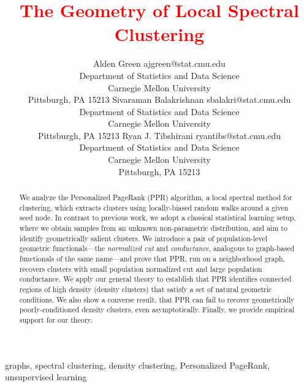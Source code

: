 \documentclass[11pt,twoside]{article}
\newcommand{\1}{\mathbf{1}}
\begin{document}
	
\title{\textcolor{red}{The Geometry of Local Spectral Clustering}}

\author{\name Alden Green \email ajgreen@stat.cmu.edu \\
	\addr Department of Statistics and Data Science\\
	Carnegie Mellon University\\
	Pittsburgh, PA 15213
	\AND
	\name Sivaraman Balakrishnan \email sbalakri@stat.cmu.edu \\
	\addr Department of Statistics and Data Science\\
	Carnegie Mellon University\\
	Pittsburgh, PA 15213
	\AND
	Ryan J. Tibshirani \email ryantibs@stat.cmu.edu \\
	\addr Department of Statistics and Data Science\\
	Carnegie Mellon University\\
	Pittsburgh, PA 15213}

\maketitle

\begin{abstract}
	We analyze the Personalized PageRank (PPR) algorithm, a local spectral method
	for clustering, which extracts clusters using locally-biased random walks around
	a given seed node.  In contrast to previous work, we adopt a classical
	statistical learning setup, where we obtain samples from an unknown non-parametric distribution, and aim to identify geometrically salient clusters.  We introduce a pair of population-level geometric functionals---the \emph{normalized cut} and \emph{conductance}, analogous to graph-based functionals of the same name---and prove that PPR, run on a neighborhood graph, recovers clusters with small population normalized cut and large population conductance. We apply our general theory to establish that PPR identifies connected regions of high density (density clusters) that satisfy a set of natural geometric conditions. We also show a converse result, that PPR can fail to recover
	geometrically poorly-conditioned density clusters, even asymptotically. Finally,
	we provide empirical support for our theory.
\end{abstract}

\begin{keywords}
	graphs, spectral clustering, density clustering, Personalized PageRank, unsupervised learning
\end{keywords}
\end{document}
